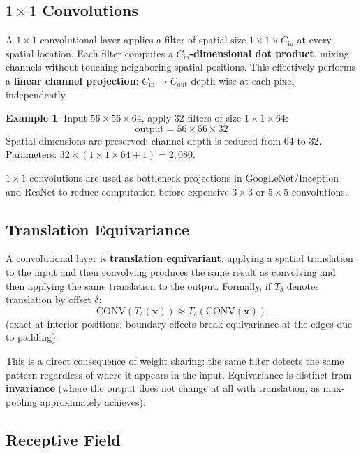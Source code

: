 \documentclass[11pt,a4paper]{article}
\theoremstyle{definition}
\newtheorem{example}{Example}[section]
\theoremstyle{plain}
\theoremstyle{remark}
\begin{document}
\subsection{$1 \times 1$ Convolutions}

A $1 \times 1$ convolutional layer applies a filter of spatial size $1 \times 1 \times C_{\text{in}}$ at every spatial location.
Each filter computes a \textbf{$C_{\text{in}}$-dimensional dot product}, mixing channels without touching neighboring spatial positions.
This effectively performs a \textbf{linear channel projection}: $C_{\text{in}} \to C_{\text{out}}$ depth-wise at each pixel independently.

\begin{example}
Input $56 \times 56 \times 64$, apply 32 filters of size $1 \times 1 \times 64$:
\[
    \text{output} = 56 \times 56 \times 32
\]
Spatial dimensions are preserved; channel depth is reduced from 64 to 32.
Parameters: $32 \times (1 \times 1 \times 64 + 1) = 2{,}080$.
\end{example}

$1 \times 1$ convolutions are used as bottleneck projections in GoogLeNet/Inception and ResNet to reduce computation before expensive $3 \times 3$ or $5 \times 5$ convolutions.

\subsection{Translation Equivariance}

A convolutional layer is \textbf{translation equivariant}: applying a spatial translation to the input and then convolving produces the same result as convolving and then applying the same translation to the output.
Formally, if $T_{\delta}$ denotes translation by offset $\delta$:
\[
    \text{CONV}(T_{\delta}(\mathbf{x})) \approx T_{\delta}(\text{CONV}(\mathbf{x}))
\]
(exact at interior positions; boundary effects break equivariance at the edges due to padding).

This is a direct consequence of weight sharing: the same filter detects the same pattern regardless of where it appears in the input. Equivariance is distinct from \textbf{invariance} (where the output does not change at all with translation, as max-pooling approximately achieves).

\subsection{Receptive Field}
\end{document}
